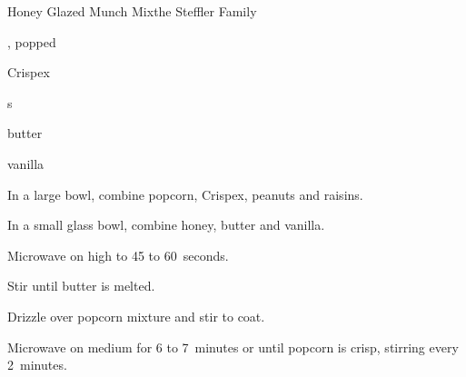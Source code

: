 \begin{recipe}{Honey Glazed Munch Mix}{the Steffler Family}{}

\begin{ingredients}
\item {} , popped
\item {} Crispex 
\item \C{\half} s
\item \C{\quarter} 
\item \C{\quarter} 
\item \C{\quarter} butter
\item \tp{\quarter} vanilla
\end{ingredients}

\begin{directions}
\item In a large bowl, combine popcorn, Crispex, peanuts and raisins.
\item In a small glass bowl, combine honey, butter and vanilla.
\item Microwave on high to 45 to 60~seconds.
\item Stir until butter is melted.
\item Drizzle over popcorn mixture and stir to coat.
\item Microwave on medium for 6 to 7~minutes or until popcorn is crisp, stirring every 2~minutes.
\end{directions}
\end{recipe}
